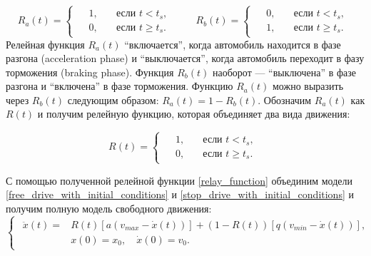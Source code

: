 \documentclass[12pt, a4paper]{extarticle}
\numberwithin{equation}{section}
\numberwithin{figure}{section}
\begin{document}
\begin{equation*} 
R_{a}(t)=
\begin{cases}
\begin{split}
&1, \quad&\text{если } t<t_{s}, \\
&0, \quad&\text{если } t\geq t_{s}.
\end{split}
\end{cases}
\qquad
R_{b}(t)=
\begin{cases}
\begin{split}
&0, \quad&\text{если } t<t_{s}, \\
&1, \quad&\text{если } t\geq t_{s}.
\end{split}
\end{cases}
\end{equation*}
Релейная функция $R_{a}(t)$ ``включается'', когда автомобиль находится в фазе разгона (acceleration phase) и ``выключается'', когда автомобиль переходит в фазу торможения (braking phase). Функция $R_{b}(t)$ наоборот --- ``выключена'' в фазе разгона и ``включена'' в фазе торможения. Функцию $R_{a}(t)$ можно выразить через $R_{b}(t)$ следующим образом: $R_{a}(t) = 1-R_{b}(t)$. Обозначим $R_{a}(t)$ как $R(t)$ и получим релейную функцию, которая объединяет два вида движения:

\begin{equation} \label{relay_function}
R(t)=
\begin{cases}
\begin{split}
&1, \quad&\text{если } t<t_{s}, \\
&0, \quad&\text{если } t\geq t_{s}.
\end{split}
\end{cases}
\end{equation}

С помощью полученной релейной функции \eqref{relay_function} объединим модели \eqref{free_drive_with_initial_conditions} и  \eqref{stop_drive_with_initial_conditions} и получим полную модель свободного движения:
\begin{equation} \label{free_drive_model}
\begin{cases}
\begin{split}
\ddot{x}(t) = &R(t) \left[ a\left(v_{max}-\dot{x}(t) \right)\right] + (1-R(t)) \left[ q\left( v_{min} - \dot{x}(t)\right) \right],  \\
&x(0)=x_0, \quad \dot{x}(0)=v_{0}.
\end{split}
\end{cases}
\end{equation}
\end{document}
